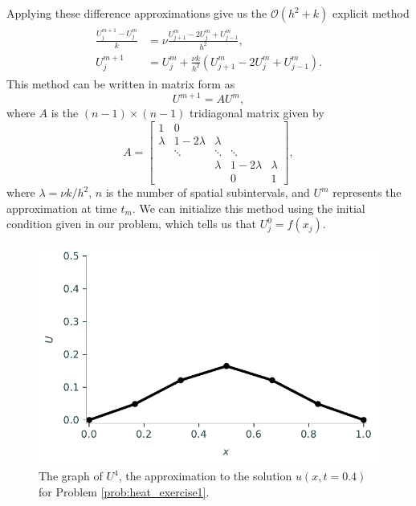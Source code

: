 \noindent
Applying these difference approximations give us the $\mathcal{O}(h^2 + k)$ explicit method
\begin{align}
	\begin{split}
	\frac{U_{j}^{m+1} - U_{j}^{m}}{k} &= \nu \frac{U_{j+1}^{m}- 2U_{j}^{m} + U_{j-1}^{m} }{h^2} ,\\
	U_{j}^{m+1} &= U_{j}^{m} + \frac{\nu k}{h^2} (U_{j+1}^{m}- 2U_{j}^{m} + U_{j-1}^{m} ).
	\end{split}\label{eqn:firstorder_explicit}
\end{align}
This method can be written in matrix form as
\[U^{m+1} = A U^m,\]
where $A$ is the $(n-1) \times (n-1)$ tridiagonal matrix given by
\[A = \left[\begin{array}{cccccc}1 & 0 & & & \\ \lambda & 1-2\lambda & \lambda & & \\ & \ddots & \ddots & \ddots & \\ & & \lambda & 1-2\lambda & \lambda \\  &  &  & 0 & 1\end{array}\right],\]
where $\lambda = \nu k/h^2$, $n$ is the number of spatial subintervals, and $U^m$ represents the approximation at time $t_m$.
We can initialize this method using the initial condition given in our problem, which tells us that $U_{j}^{0} = f(x_j)$.

\begin{figure}
\centering
\includegraphics[width=\textwidth]{figures/heatexercise1b.pdf}
\caption{The graph of $U^{4}$, the approximation to the solution $u(x,t=0.4)$ for Problem \ref{prob:heat_exercise1}.}
\label{fig:heatexercise1b}
\end{figure}

